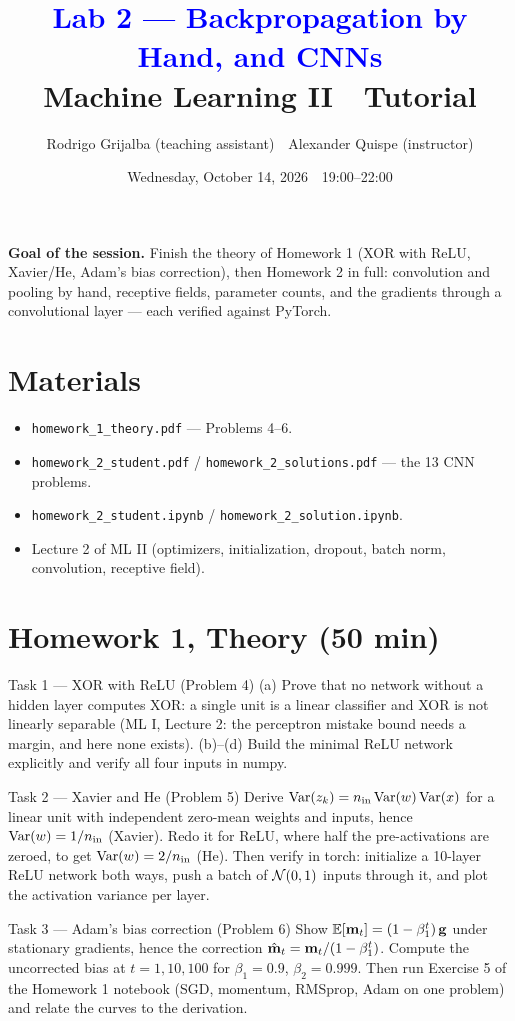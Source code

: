 \documentclass[11pt]{article}
\title{\textcolor{blue}{Lab 2 --- Backpropagation by Hand, and CNNs}\\[4pt]
\large Machine Learning II \,\textperiodcentered\, Tutorial}
\author{Rodrigo Grijalba (teaching assistant) \,\textperiodcentered\, Alexander Quispe (instructor)}
\date{Wednesday, October 14, 2026 \,\textperiodcentered\, 19:00--22:00}
\begin{document}
\maketitle

\begin{keypoint}
\textbf{Goal of the session.} Finish the theory of Homework 1 (XOR with ReLU, Xavier/He, Adam's bias
correction), then Homework 2 in full: convolution and pooling by hand, receptive fields, parameter
counts, and the gradients through a convolutional layer --- each verified against PyTorch.
\end{keypoint}

\section*{Materials}
\begin{itemize}[nosep]
  \item \texttt{homework\_1\_theory.pdf} --- Problems 4--6.
  \item \texttt{homework\_2\_student.pdf} / \texttt{homework\_2\_solutions.pdf} --- the 13 CNN problems.
  \item \texttt{homework\_2\_student.ipynb} / \texttt{homework\_2\_solution.ipynb}.
  \item Lecture 2 of ML II (optimizers, initialization, dropout, batch norm, convolution, receptive field).
\end{itemize}

\section{Homework 1, Theory (50 min)}
\begin{task}{Task 1 --- XOR with ReLU (Problem 4)}
(a) Prove that no network without a hidden layer computes XOR: a single unit is a linear classifier
and XOR is not linearly separable (ML I, Lecture 2: the perceptron mistake bound needs a margin, and here
none exists). (b)--(d) Build the minimal ReLU network explicitly and verify all four inputs in numpy.
\end{task}
\begin{task}{Task 2 --- Xavier and He (Problem 5)}
Derive $\operatorname{Var}(z_k)=n_{\text{in}}\operatorname{Var}(w)\operatorname{Var}(x)$ for a linear unit with independent zero-mean weights and
inputs, hence $\operatorname{Var}(w)=1/n_{\text{in}}$ (Xavier). Redo it for ReLU, where half the pre-activations are
zeroed, to get $\operatorname{Var}(w)=2/n_{\text{in}}$ (He). Then verify in torch: initialize a 10-layer ReLU network
both ways, push a batch of $\mathcal{N}(0,1)$ inputs through it, and plot the activation variance per layer.
\end{task}
\begin{task}{Task 3 --- Adam's bias correction (Problem 6)}
Show $\mathbb{E}[\mathbf{m}_t]=(1-\beta_1^t)\,\mathbf{g}$ under stationary gradients, hence the correction $\hat{\mathbf{m}}_t=\mathbf{m}_t/(1-\beta_1^t)$.
Compute the uncorrected bias at $t=1,10,100$ for $\beta_1=0.9$, $\beta_2=0.999$. Then run Exercise 5 of the
Homework 1 notebook (SGD, momentum, RMSprop, Adam on one problem) and relate the curves to the derivation.
\end{task}
\end{document}
